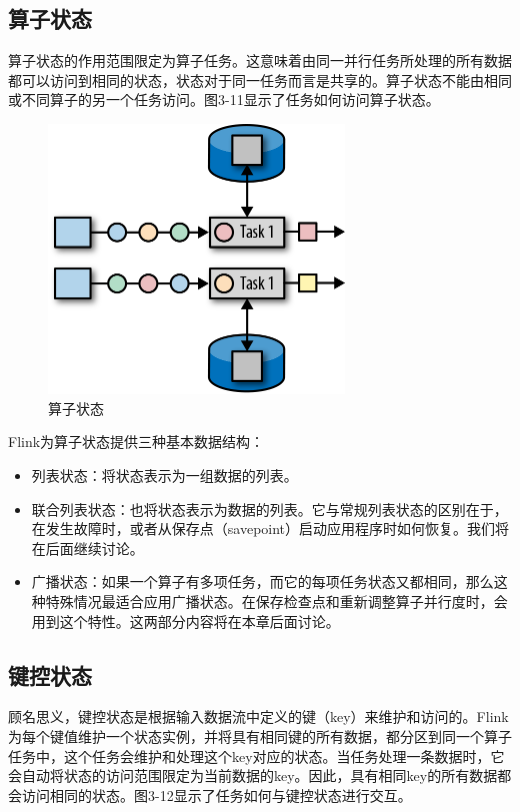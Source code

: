 \documentclass[cn,11pt,chinese]{elegantbook}
\begin{document}
\subsection{算子状态}

算子状态的作用范围限定为算子任务。这意味着由同一并行任务所处理的所有数据都可以访问到相同的状态，状态对于同一任务而言是共享的。算子状态不能由相同或不同算子的另一个任务访问。图3-11显示了任务如何访问算子状态。

\begin{figure}[htbp]
    \centering
    \includegraphics[width=0.7\textwidth]{images/spaf_0311.png}
    \caption{算子状态}
\end{figure}

Flink为算子状态提供三种基本数据结构：

\begin{itemize}
    \item 列表状态：将状态表示为一组数据的列表。
    \item 联合列表状态：也将状态表示为数据的列表。它与常规列表状态的区别在于，在发生故障时，或者从保存点（savepoint）启动应用程序时如何恢复。我们将在后面继续讨论。
    \item 广播状态：如果一个算子有多项任务，而它的每项任务状态又都相同，那么这种特殊情况最适合应用广播状态。在保存检查点和重新调整算子并行度时，会用到这个特性。这两部分内容将在本章后面讨论。
\end{itemize}

\subsection{键控状态}

顾名思义，键控状态是根据输入数据流中定义的键（key）来维护和访问的。Flink为每个键值维护一个状态实例，并将具有相同键的所有数据，都分区到同一个算子任务中，这个任务会维护和处理这个key对应的状态。当任务处理一条数据时，它会自动将状态的访问范围限定为当前数据的key。因此，具有相同key的所有数据都会访问相同的状态。图3-12显示了任务如何与键控状态进行交互。
\end{document}
